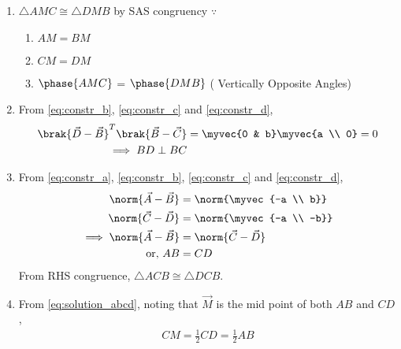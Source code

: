 \renewcommand{\theequation}{\theenumi}
\begin{enumerate}[label=\thesection.\arabic*.,ref=\thesection.\theenumi]
	
\item $\triangle AMC \cong \triangle DMB$  by SAS congruency $\because$
\begin{enumerate}
\item $AM = BM$
\item $CM = DM$
\item $\phase{AMC}$ = $\phase{DMB}$ ( Vertically Opposite Angles)
\end{enumerate}
%
\item From \eqref{eq:constr_b}, \eqref{eq:constr_c} and \eqref{eq:constr_d},
%
%
\begin{align}
\brak{\vec{D}-\vec{B}}^T
\brak{\vec{B}-\vec{C}} &= \myvec{0 & b}\myvec{a \\ 0} = 0
\\
\implies BD \perp BC
\end{align}
%
\item From \eqref{eq:constr_a}, \eqref{eq:constr_b}, \eqref{eq:constr_c} and \eqref{eq:constr_d},
\begin{align}
\norm{\vec{A}-\vec{B}} &= \norm{\myvec{-a \\ b}}
\\
\norm{\vec{C}-\vec{D}} &= \norm{\myvec{-a \\ -b}}
\\
\implies \norm{\vec{A}-\vec{B}} &= \norm{\vec{C}-\vec{D}}\\
\text{or, } AB &=CD
\label{eq:solution_abcd}
\end{align}
%
From RHS congruence,  $\triangle ACB \cong  \triangle DCB$.
\item From \eqref{eq:solution_abcd}, noting that $\vec{M}$ is the mid point of both $AB$ and $CD$, 
\begin{align}
CM = \frac{1}{2}CD =\frac{1}{2} AB
\end{align}



\end{enumerate}